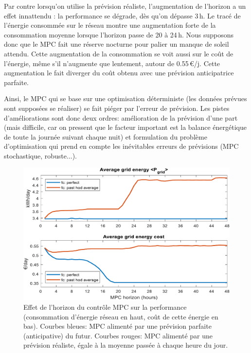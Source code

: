 \documentclass[a4paper,10pt,twocolumn]{article}
\begin{document}
Par contre lorsqu'on utilise la prévision réaliste, l'augmentation
de l'horizon a un effet innattendu : la performance se dégrade,
dès qu'on dépasse 3\,h. 
Le tracé de l'énergie consommée sur le réseau montre une augmentation forte de la consommation moyenne
lorsque l'horizon passe de 20 à 24\,h.
Nous supposons donc que le MPC fait une réserve nocturne pour palier un manque
de soleil attendu.
Cette augmentation de la consommation se voit aussi sur le coût de l'énergie,
même s'il n'augmente que lentement, autour de 0.55\,€/j.
Cette augmentation le fait diverger du coût obtenu avec une prévision anticipatrice parfaite.

Ainsi, le MPC qui se base sur une optimisation déterministe
(les données prévues sont supposées se réaliser) se fait piéger
par l'erreur de prévision.
Les pistes d'améliorations sont donc deux ordres:
amélioration de la prévision d'une part
(mais difficile, car on pressent que le facteur important est la balance énergétique
de toute la journée suivant chaque nuit)
et formulation du problème d'optimisation qui prend en compte les inévitables
erreurs de prévisions (MPC stochastique, robuste...).

\begin{figure}
        \begin{center}
                \includegraphics[width=1\columnwidth]{figures/MPC_horizon_effect.pdf}
        \end{center}

        \caption{Effet de l'horizon du contrôle MPC sur la performance
        (consommation d'énergie réseau en haut, coût de cette énergie en bas).
        Courbes bleues: MPC alimenté par une prévision parfaite (anticipative) du futur.
        Courbes rouges: MPC alimenté par une prévision réaliste, égale à la moyenne passée à chaque heure du jour. 
        }
        \label{fig:mpc_horiz}
\end{figure}
\end{document}
